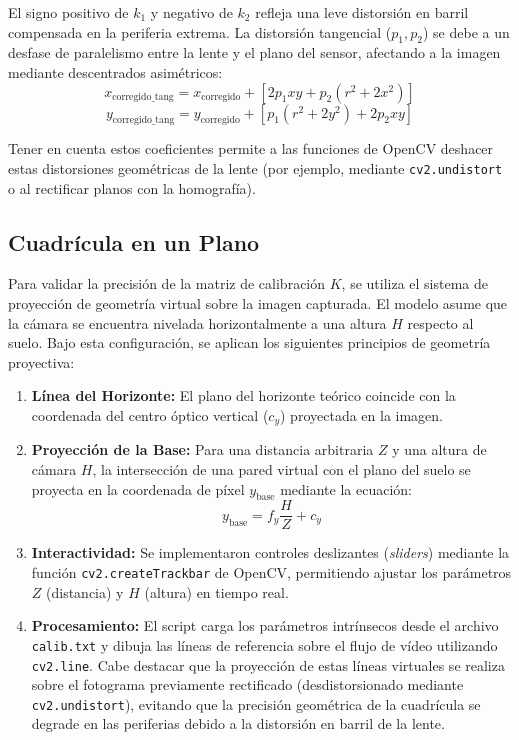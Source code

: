 \documentclass[12pt,a4paper]{article}
\begin{document}
El signo positivo de $k_1$ y negativo de $k_2$ refleja una leve distorsión en barril compensada en la periferia extrema. La distorsión tangencial ($p_1, p_2$) se debe a un desfase de paralelismo entre la lente y el plano del sensor, afectando a la imagen mediante descentrados asimétricos:
\begin{equation}
    x_{\text{corregido\_tang}} = x_{\text{corregido}} + [2p_1 xy + p_2(r^2 + 2x^2)]
\end{equation}
\begin{equation}
    y_{\text{corregido\_tang}} = y_{\text{corregido}} + [p_1(r^2 + 2y^2) + 2p_2 xy]
\end{equation}

Tener en cuenta estos coeficientes permite a las funciones de OpenCV deshacer estas distorsiones geométricas de la lente (por ejemplo, mediante \texttt{cv2.undistort} o al rectificar planos con la homografía).

\subsection{Cuadrícula en un Plano}
Para validar la precisión de la matriz de calibración $K$, se utiliza el sistema de proyección de geometría virtual sobre la imagen capturada. El modelo asume que la cámara se encuentra nivelada horizontalmente a una altura $H$ respecto al suelo. Bajo esta configuración, se aplican los siguientes principios de geometría proyectiva:

\begin{enumerate}
    \item \textbf{Línea del Horizonte:} El plano del horizonte teórico coincide con la coordenada del centro óptico vertical ($c_y$) proyectada en la imagen.
    \item \textbf{Proyección de la Base:} Para una distancia arbitraria $Z$ y una altura de cámara $H$, la intersección de una pared virtual con el plano del suelo se proyecta en la coordenada de píxel $y_{\text{base}}$ mediante la ecuación:
    \begin{equation}
        y_{\text{base}} = f_y \frac{H}{Z} + c_y
    \end{equation}
    \item \textbf{Interactividad:} Se implementaron controles deslizantes (\textit{sliders}) mediante la función \texttt{cv2.createTrackbar} de OpenCV, permitiendo ajustar los parámetros $Z$ (distancia) y $H$ (altura) en tiempo real.
    \item \textbf{Procesamiento:} El script carga los parámetros intrínsecos desde el archivo \texttt{calib.txt} y dibuja las líneas de referencia sobre el flujo de vídeo utilizando \texttt{cv2.line}. Cabe destacar que la proyección de estas líneas virtuales se realiza sobre el fotograma previamente rectificado (desdistorsionado mediante \texttt{cv2.undistort}), evitando que la precisión geométrica de la cuadrícula se degrade en las periferias debido a la distorsión en barril de la lente.
\end{enumerate}
\end{document}
